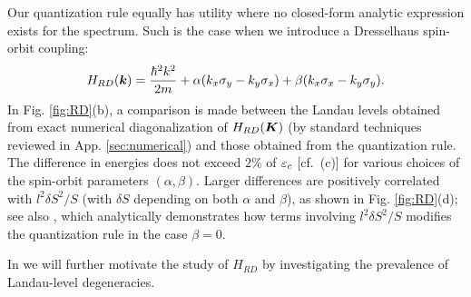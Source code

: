 \documentclass[aps, prb, showpacs, twocolumn, notitlepage, superscriptaddress]{revtex4-1}
\begin{document}
Our quantization rule equally has utility where no closed-form analytic expression exists for the spectrum. Such is the case when we introduce a Dresselhaus spin-orbit coupling:
\begin{equation}
 H_{RD}(\bk)=\frac{{\hbar^2}k^2}{2m}+\alpha(k_{x}\sigma_{y}-k_{y}\sigma_{x})+\beta(k_{x}\sigma_{x}-k_{y}\sigma_{y}).\la{hamRD}
\end{equation}
In Fig. \ref{fig:RD}(b), a comparison is made between the Landau levels obtained from exact numerical diagonalization of $H_{RD}(\boldsymbol{K})$ (by standard techniques reviewed in App. \ref{sec:numerical}) and those obtained from the quantization rule. The difference in energies  does not exceed $2\%$ of $\varepsilon_c$ [cf.\ (c)] for various choices of the spin-orbit parameters $(\alpha,\beta)$.
Larger differences are positively correlated with 
$l^2\delta S^2/S$ (with $\delta S$ depending on both $\alpha$ and $\beta$), as shown in Fig. \ref{fig:RD}(d); see also , which analytically demonstrates how terms involving $l^2\delta S^2/S$ modifies the quantization rule in the case $\beta=0$. 

In  we will further motivate the study of $H_{RD}$ by investigating the prevalence of Landau-level degeneracies. 





\end{document}
